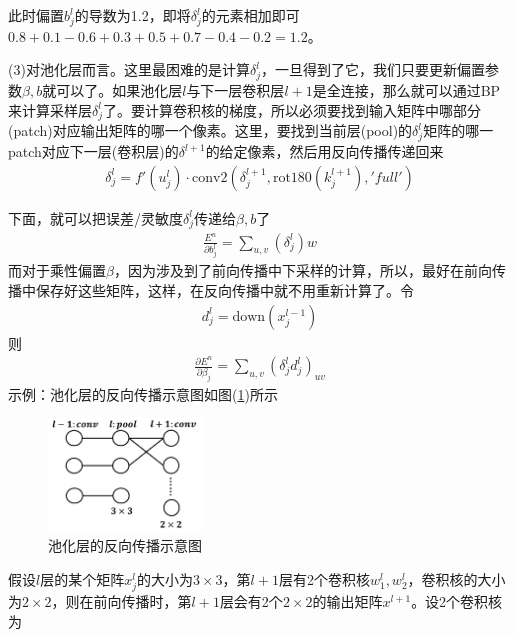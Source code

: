             此时偏置$b_j^l$的导数为1.2，即将$\delta_j^l$的元素相加即可$0.8+0.1-0.6+0.3+0.5+0.7-0.4-0.2=1.2$。
            \par
            (3)对池化层而言。这里最困难的是计算$\delta_j^l$，一旦得到了它，我们只要更新偏置参数$\beta,b$就可以了。如果池化层$l$与下一层卷积层$l+1$是全连接，那么就可以通过BP来计算采样层$\delta_j^l$了。要计算卷积核的梯度，所以必须要找到输入矩阵中哪部分(patch)对应输出矩阵的哪一个像素。这里，要找到当前层(pool)的$\delta_j^l$矩阵的哪一patch对应下一层(卷积层)的$\delta^{l+1}$的给定像素，然后用反向传播传递回来
            \begin{align*}
            \delta_j^l = f'(u_j^l)\cdot \mathrm{conv2} \left( \delta_j^{l+1},\mathrm{rot180}(k_j^{l+1}),'full' \right)
            \end{align*}
            \par
            下面，就可以把误差/灵敏度$\delta_j^l$传递给$\beta,b$了
            \begin{align*}
            \frac{E^n}{\partial b_j^l} =  \sum_{u,v}(\delta_j^l)w
            \end{align*}
            而对于乘性偏置$\beta$，因为涉及到了前向传播中下采样的计算，所以，最好在前向传播中保存好这些矩阵，这样，在反向传播中就不用重新计算了。令
            \begin{align*}
            d_j^l = \mathrm{down}(x_j^{l-1})
            \end{align*}
            则
            \begin{align*}
            \frac{\partial E^n}{\partial \beta_j} = \sum_{u,v} \left( \delta_j^l d_j^l \right) _{uv}
            \end{align*}
            示例：池化层的反向传播示意图如图(\ref{fig:池化层的反向传播示意图})所示
            \begin{figure}[H]
            \centering
            \includegraphics[height=3cm]{images/The_reverse_propagation_of_the_pool_layer.jpg}
            \caption{池化层的反向传播示意图}
            \label{fig:池化层的反向传播示意图}
            \end{figure}
            假设$l$层的某个矩阵$x_j^l$的大小为$3\times 3$，第$l+1$层有2个卷积核$w_1^l,w_2^l$，卷积核的大小为$2\times 2$，则在前向传播时，第$l+1$层会有2个$2\times 2$的输出矩阵$x^{l+1}$。设2个卷积核为
